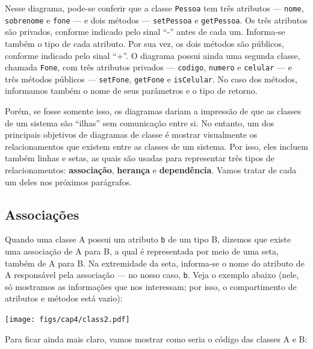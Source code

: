 \documentclass[
  11pt,
  twoside]{book}
\newcommand{\passthrough}[1]{#1}
\begin{document}
Nesse diagrama, pode-se conferir que a classe
\passthrough{\lstinline!Pessoa!} tem três atributos ---
\passthrough{\lstinline!nome!}, \passthrough{\lstinline!sobrenome!} e
\passthrough{\lstinline!fone!} --- e dois métodos ---
\passthrough{\lstinline!setPessoa!} e
\passthrough{\lstinline!getPessoa!}. Os três atributos são privados,
conforme indicado pelo sinal ``-'' antes de cada um. Informa-se também o
tipo de cada atributo. Por sua vez, os dois métodos são públicos,
conforme indicado pelo sinal ``+''. O diagrama possui ainda uma segunda
classe, chamada \passthrough{\lstinline!Fone!}, com três atributos
privados --- \passthrough{\lstinline!codigo!},
\passthrough{\lstinline!numero!} e \passthrough{\lstinline!celular!} ---
e três métodos públicos --- \passthrough{\lstinline!setFone!},
\passthrough{\lstinline!getFone!} e \passthrough{\lstinline!isCelular!}.
No caso dos métodos, informamos também o nome de seus parâmetros e o
tipo de retorno.

Porém, se fosse somente isso, os diagramas dariam a impressão de que as
classes de um sistema são ``ilhas'' sem comunicação entre si. No
entanto, um dos principais objetivos de diagramas de classe é mostrar
visualmente os relacionamentos que existem entre as classes de um
sistema. Por isso, eles incluem também linhas e setas, as quais são
usadas para representar três tipos de relacionamentos:
\textbf{associação}, \textbf{herança} e \textbf{dependência}. Vamos
tratar de cada um deles nos próximos parágrafos.

\hypertarget{associauxe7uxf5es}{%
\subsection{Associações}\label{associauxe7uxf5es}}


Quando uma classe A possui um atributo \passthrough{\lstinline!b!} de um
tipo B, dizemos que existe uma associação de A para B, a qual é
representada por meio de uma seta, também de A para B. Na extremidade da
seta, informa-se o nome do atributo de A responsável pela associação ---
no nosso caso, \passthrough{\lstinline!b!}. Veja o exemplo abaixo (nele,
só mostramos as informações que nos interessam; por isso, o
compartimento de atributos e métodos está vazio):

\texttt{[image: figs/cap4/class2.pdf]}

Para ficar ainda mais claro, vamos mostrar como seria o código das
classes A e B:
\end{document}
